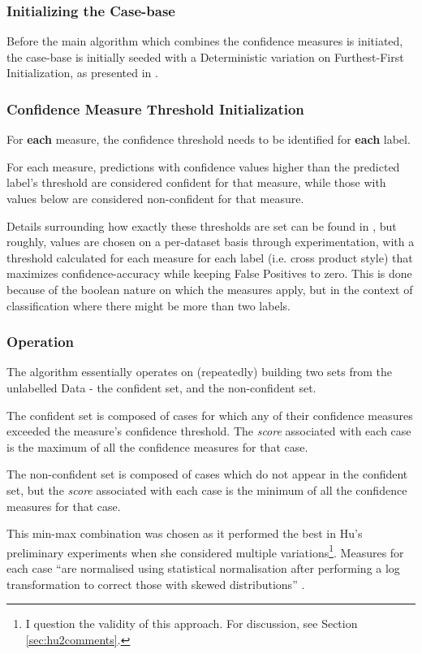\documentclass[a4paper,11pt]{report}
\begin{document}
\subsubsection{Initializing the Case-base}
Before the main algorithm which combines the confidence measures is initiated, the case-base is initially seeded with a Deterministic variation on Furthest-First Initialization, as presented in \citet{Greene2007}.

\subsubsection{Confidence Measure Threshold Initialization}
For \textbf{each} measure, the confidence threshold needs to be identified for \textbf{each} label.

For each measure, predictions with confidence values higher than the predicted label's threshold are considered confident for that measure, while those with values below are considered non-confident for that measure.

Details surrounding how exactly these thresholds are set can be found in \citet{Delany2005}, but roughly, values are chosen on a per-dataset basis through experimentation, with a threshold calculated for each measure for each label (i.e. cross product style) that maximizes confidence-accuracy while keeping False Positives to zero. This is done because of the boolean nature on which the measures apply, but in the context of classification where there might be more than two labels. 

\subsubsection{Operation}
The algorithm essentially operates on (repeatedly) building two sets from the unlabelled Data - the confident set, and the non-confident set.

The confident set is composed of cases for which any of their confidence measures exceeded the measure's confidence threshold. The \emph{score} associated with each case is the maximum of all the confidence measures for that case.

The non-confident set is composed of cases which do not appear in the confident set, but the \emph{score} associated with each case is the minimum of all the confidence measures for that case. 

This min-max combination was chosen as it performed the best in Hu's preliminary experiments when she considered multiple variations\footnote{I question the validity of this approach. For discussion, see Section \ref{sec:hu2comments}.}. Measures for each case ``are normalised using statistical normalisation after performing a log transformation to correct those with skewed distributions'' \citep{Hu2011}.
\end{document}
